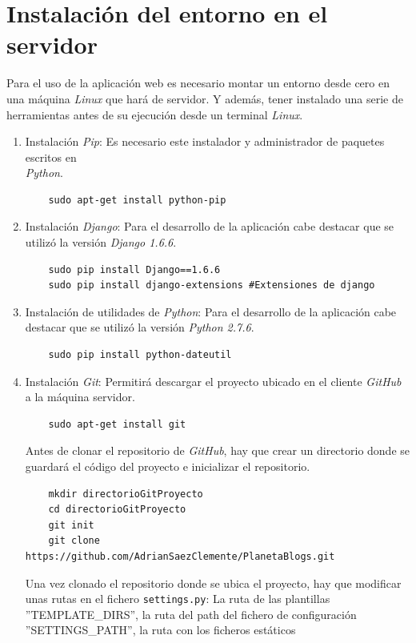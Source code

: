 \documentclass[a4paper, 12pt]{book}
\begin{document}
\section{Instalaci\'on del entorno en el servidor}
Para el uso de la aplicaci\'on web es necesario montar un entorno desde cero en una m\'aquina \textit{Linux} que har\'a de servidor. Y adem\'as, tener 
instalado una serie de herramientas antes de su ejecuci\'on desde un terminal \textit{Linux}.
\begin{enumerate}
  \item Instalaci\'on \textit{Pip}: Es necesario este instalador y administrador de paquetes escritos en\\ \textit{Python}.
    {\footnotesize\begin{verbatim} 
    sudo apt-get install python-pip\end{verbatim}}
  \item Instalaci\'on \textit{Django}: Para el desarrollo de la aplicaci\'on cabe destacar que se utiliz\'o la versi\'on \textit{Django 1.6.6}.
    {\footnotesize\begin{verbatim} 
    sudo pip install Django==1.6.6
    sudo pip install django-extensions #Extensiones de django \end{verbatim}}
  \item Instalaci\'on de utilidades de \textit{Python}: Para el desarrollo de la aplicaci\'on cabe destacar que se utiliz\'o la versi\'on 
  \textit{Python 2.7.6}.
    {\footnotesize\begin{verbatim} 
    sudo pip install python-dateutil \end{verbatim}}
  \item Instalaci\'on \textit{Git}: Permitir\'a descargar el proyecto ubicado en el cliente \textit{GitHub} a la m\'aquina servidor.
    {\footnotesize\begin{verbatim} 
    sudo apt-get install git \end{verbatim}}
  Antes de clonar el repositorio de \textit{GitHub}, hay que crear un directorio donde se guardar\'a el c\'odigo del proyecto e inicializar el repositorio.
    {\footnotesize\begin{verbatim} 
    mkdir directorioGitProyecto 
    cd directorioGitProyecto 
    git init 
    git clone https://github.com/AdrianSaezClemente/PlanetaBlogs.git \end{verbatim}}
  Una vez clonado el repositorio donde se ubica el proyecto, hay que modificar unas rutas en el fichero \texttt{settings.py}: 
  La ruta de las plantillas ''TEMPLATE\_DIRS'', la ruta del path del fichero de configuraci\'on ''SETTINGS\_PATH'', la ruta con los ficheros est\'aticos 

\end{enumerate}
\end{document}
